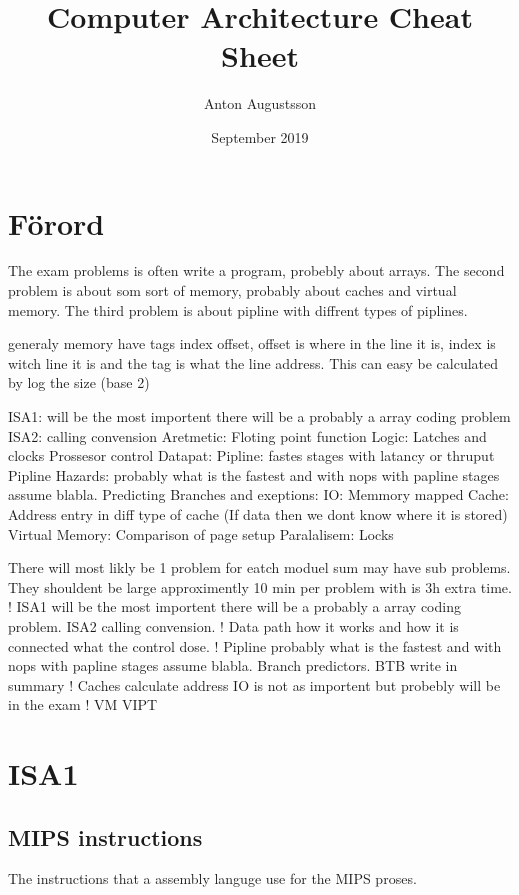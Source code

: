 \documentclass{article}
\title{Computer Architecture Cheat Sheet}
\author{Anton Augustsson}
\date{September 2019}
\begin{document}
\maketitle
\newpage
\tableofcontents
\newpage

\section{Förord}
The exam problems is often write a program, probebly about arrays.
The second problem is about som sort of memory, probably about caches and virtual memory.
The third problem is about pipline with diffrent types of piplines.


generaly memory have tags index offset, offset is where in the line it is, index is witch line it is and the tag is what the line address.
This can easy be calculated by log the size (base 2)

ISA1: will be the most importent there will be a probably a array coding problem
ISA2: calling convension
Aretmetic: Floting point function
Logic: Latches and clocks
Prossesor control Datapat:
Pipline: fastes stages with latancy or thruput
Pipline Hazards: probably what is the fastest and with nops with papline stages assume blabla.
Predicting Branches and exeptions: 
IO: Memmory mapped
Cache: Address entry in diff type of cache (If data then we dont know where it is stored)
Virtual Memory: Comparison of page setup
Paralalisem: Locks


There will most likly be 1 problem for eatch moduel
sum may have sub problems. They shouldent be large approximently 10 min per problem with is 3h extra time.
! ISA1 will be the most importent there will be a probably a array coding problem.
ISA2 calling convension.
! Data path how it works and how it is connected what the control dose.
! Pipline probably what is the fastest and with nops with papline stages assume blabla.
Branch predictors. BTB write in summary
! Caches calculate address
IO is not as importent but probebly will be in the exam
! VM  VIPT



\newpage

\section{ISA1}
\subsection{MIPS instructions}
The instructions that a assembly languge use for the MIPS proses.
\end{document}
